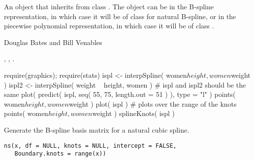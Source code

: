 %
\begin{Value}
An object that inherits from class . The object can be in
the B-spline representation, in which case it will be of class
 for natural B-spline, or in the piecewise polynomial
representation, in which case it will be of class .
\end{Value}
%
\begin{Author}\relax
Douglas Bates and Bill Venables
\end{Author}
%
\begin{SeeAlso}\relax
{},
,
.
\end{SeeAlso}
%
\begin{Examples}
\begin{ExampleCode}
require(graphics); require(stats)
ispl <- interpSpline( women$height, women$weight )
ispl2 <- interpSpline( weight ~ height,  women )
# ispl and ispl2 should be the same
plot( predict( ispl, seq( 55, 75, length.out = 51 ) ), type = "l" )
points( women$height, women$weight )
plot( ispl )    # plots over the range of the knots
points( women$height, women$weight )
splineKnots( ispl )
\end{ExampleCode}
\end{Examples}
%
\begin{Description}\relax
Generate the B-spline basis matrix for a natural cubic spline.
\end{Description}
%
\begin{Usage}
\begin{verbatim}
ns(x, df = NULL, knots = NULL, intercept = FALSE,
   Boundary.knots = range(x))
\end{verbatim}
\end{Usage}
%
